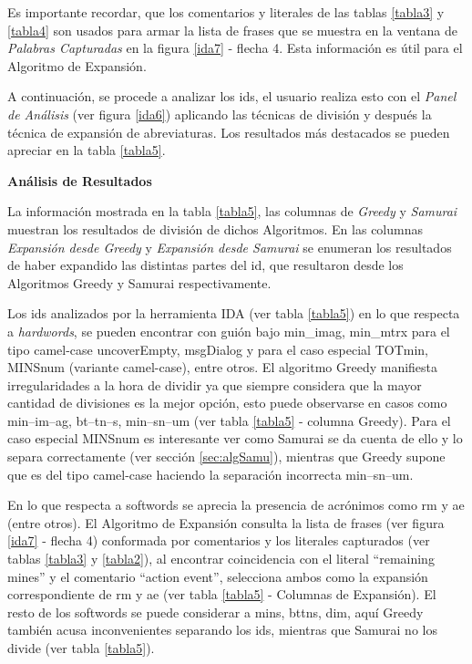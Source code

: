 Es importante recordar, que los comentarios y literales de las tablas \ref{tabla3} y \ref{tabla4} son usados para armar la lista de frases que se muestra en la ventana de \textit{Palabras Capturadas} en la figura \ref{ida7} - flecha 4. Esta información es útil para el Algoritmo de Expansión.

A continuación, se procede a analizar los ids, el usuario realiza esto con el \textit{Panel de Análisis} (ver figura \ref{ida6}) aplicando las técnicas de división y después la técnica de expansión de abreviaturas. Los resultados más destacados se pueden apreciar en la tabla \ref{tabla5}.

\pagebreak

\noindent \textbf{Análisis de Resultados\\}

La información mostrada en la tabla \ref{tabla5}, las columnas de \textit{Greedy} y \textit{Samurai} muestran los resultados de división de dichos Algoritmos. En las columnas \textit{Expansión desde Greedy} y \textit{Expansión desde Samurai} se enumeran los resultados de haber expandido las distintas partes del id, que resultaron desde los Algoritmos Greedy y Samurai respectivamente.

Los ids analizados por la herramienta IDA (ver tabla \ref{tabla5}) en lo que respecta a \textit{hardwords}, se pueden encontrar con guión bajo  \textsf{min\_imag}, \textsf{min\_mtrx}  para el tipo camel-case  \textsf{uncoverEmpty}, \mbox{\textsf{msgDialog}} y para el caso especial \textsf{TOTmin}, \textsf{MINSnum} (variante camel-case), entre otros. El algoritmo Greedy manifiesta irregularidades a la hora de dividir ya que siempre considera que la mayor cantidad de divisiones es la mejor opción, esto puede observarse en casos como \textsf{min--im--ag},  \textsf{bt--tn--s}, \textsf{min--sn--um} (ver tabla \ref{tabla5} - columna Greedy). Para el caso especial \textsf{MINSnum} es interesante ver como Samurai se da cuenta de ello y lo separa correctamente (ver sección \ref{sec:algSamu}), mientras que Greedy supone que es del tipo camel-case haciendo la separación incorrecta \textsf{min--sn--um}.

En lo que respecta a softwords se aprecia la presencia de acrónimos como \textsf{rm} y \textsf{ae} (entre otros). El Algoritmo de Expansión consulta la lista de frases (ver figura \ref{ida7} - flecha 4) conformada por comentarios y los literales capturados (ver tablas \ref{tabla3} y \ref{tabla2}), al encontrar coincidencia con el literal \textsf{“remaining mines”} y el comentario \textsf{“action event”}, selecciona ambos como la expansión correspondiente de \textsf{rm} y \textsf{ae} (ver tabla \ref{tabla5} - Columnas de Expansión).
El resto de los softwords se puede considerar a \textsf{mins}, \textsf{bttns}, \textsf{dim}, aquí Greedy también acusa inconvenientes separando los ids, mientras que Samurai no los divide (ver tabla \ref{tabla5}). %


